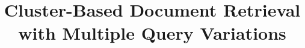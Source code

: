 \documentclass[sigconf,natbib=true,anonymous=true]{acmart}
\title{Cluster-Based Document Retrieval with Multiple Query Variations}
\begin{document}

\maketitle






\newpage
\balance


\end{document}

